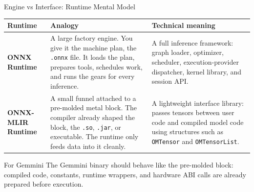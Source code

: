 \documentclass[aspectratio=169,10pt]{beamer}
\newcommand{\code}[1]{\texttt{\footnotesize #1}}
\newcommand{\edgeword}[1]{\textcolor{red!75!black}{\textbf{#1}}}
\begin{document}
\begin{frame}{Engine vs Interface: Runtime Mental Model}
  \scriptsize
  \begin{tabularx}{\textwidth}{@{}lXX@{}}
    \toprule
    Runtime & Analogy & Technical meaning \\
    \midrule
    \edgeword{ONNX Runtime} &
      A large factory engine. You give it the machine plan, the \code{.onnx} file. It loads the plan, prepares tools, schedules work, and runs the gears for every inference. &
      A full inference framework: graph loader, optimizer, scheduler, execution-provider dispatcher, kernel library, and session API. \\
    \edgeword{ONNX-MLIR Runtime} &
      A small funnel attached to a pre-molded metal block. The compiler already shaped the block, the \code{.so}, \code{.jar}, or executable. The runtime only feeds data into it cleanly. &
      A lightweight interface library: passes tensors between user code and compiled model code using structures such as \code{OMTensor} and \code{OMTensorList}. \\
    \bottomrule
  \end{tabularx}

  \vspace{0.55em}
  \begin{block}{For Gemmini}
    The Gemmini binary should behave like the pre-molded block: compiled code, constants, runtime wrappers, and hardware ABI calls are already prepared before execution.
  \end{block}
\end{frame}
\end{document}
